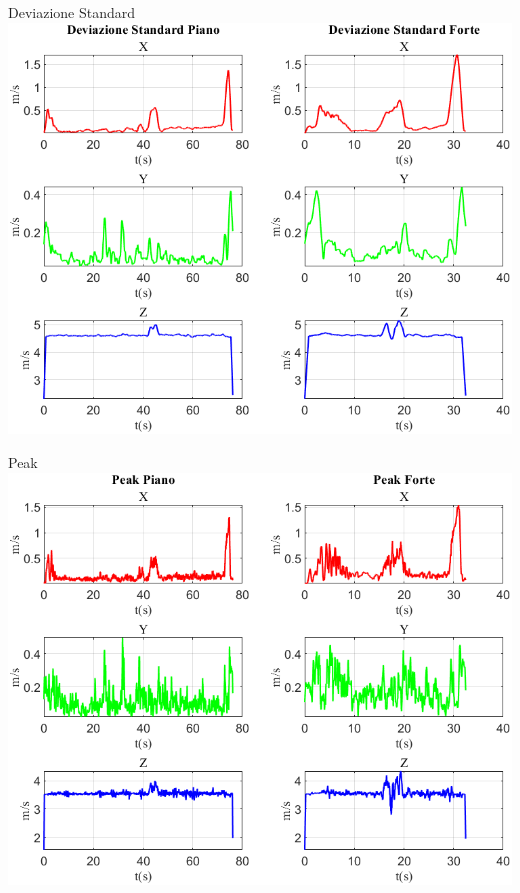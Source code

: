 \documentclass[beamer]{standalone}
\begin{document}
	\begin{frame}{{Deviazione Standard}}
		\centering\includegraphics[height=.8\textheight]{figure/Vel/Deviazione Standard}
	\end{frame}
	
	
%	
	
	\begin{frame}{{Peak}}
		\centering\includegraphics[height=.8\textheight]{figure/Vel/Peak}
	\end{frame}
	
\end{document}
